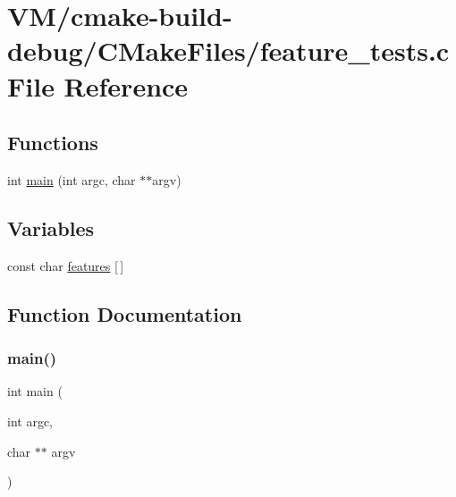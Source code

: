 \hypertarget{_v_m_2cmake-build-debug_2_c_make_files_2feature__tests_8c}{}\section{V\+M/cmake-\/build-\/debug/\+C\+Make\+Files/feature\+\_\+tests.c File Reference}
\label{_v_m_2cmake-build-debug_2_c_make_files_2feature__tests_8c}
\subsection*{Functions}
\begin{DoxyCompactItemize}
\item 
int \mbox{\hyperlink{_v_m_2cmake-build-debug_2_c_make_files_2feature__tests_8c_a3c04138a5bfe5d72780bb7e82a18e627}{main}} (int argc, char $\ast$$\ast$argv)
\end{DoxyCompactItemize}
\subsection*{Variables}
\begin{DoxyCompactItemize}
\item 
const char \mbox{\hyperlink{_v_m_2cmake-build-debug_2_c_make_files_2feature__tests_8c_a1582568e32f689337602a16bf8a5bff0}{features}} \mbox{[}$\,$\mbox{]}
\end{DoxyCompactItemize}


\subsection{Function Documentation}
\mbox{\label{_v_m_2cmake-build-debug_2_c_make_files_2feature__tests_8c_a3c04138a5bfe5d72780bb7e82a18e627}} 
\subsubsection{\texorpdfstring{main()}{main()}}
{\footnotesize\ttfamily int main (\begin{DoxyParamCaption}\item[{int}]{argc,  }\item[{char $\ast$$\ast$}]{argv }\end{DoxyParamCaption})}



